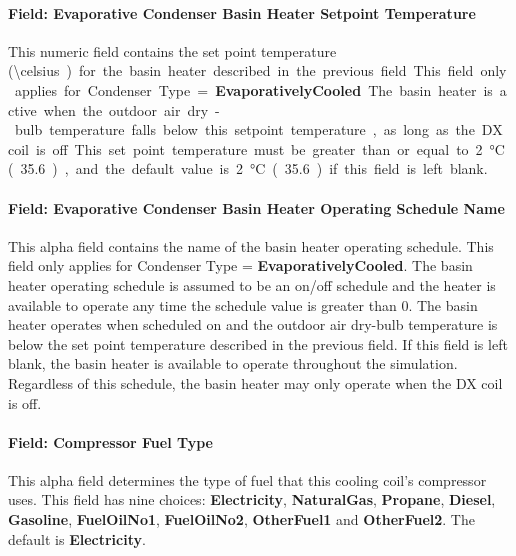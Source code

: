 \paragraph{Field: Evaporative Condenser Basin Heater Setpoint Temperature}\label{field-evaporative-condenser-basin-heater-setpoint-temperature-000}

This numeric field contains the set point temperature (\SI{\celsius}) for the basin heater described in the previous field. This field only applies for Condenser Type = \textbf{EvaporativelyCooled}. The basin heater is active when the outdoor air dry-bulb temperature falls below this setpoint temperature, as long as the DX coil is off. This set point temperature must be greater than or equal to \SI{2}{\celsius} (\SI{35.6}{\fahrenheit}), and the default value is \SI{2}{\celsius} (\SI{35.6}{\fahrenheit}) if this field is left blank.

\paragraph{Field: Evaporative Condenser Basin Heater Operating Schedule Name}\label{field-evaporative-condenser-basin-heater-operating-schedule-name-000}

This alpha field contains the name of the basin heater operating schedule. This field only applies for Condenser Type = \textbf{EvaporativelyCooled}. The basin heater operating schedule is assumed to be an on/off schedule and the heater is available to operate any time the schedule value is greater than 0. The basin heater operates when scheduled on and the outdoor air dry-bulb temperature is below the set point temperature described in the previous field. If this field is left blank, the basin heater is available to operate throughout the simulation. Regardless of this schedule, the basin heater may only operate when the DX coil is off.

\paragraph{Field: Compressor Fuel Type}\label{field-compressor-fuel-type-000}

This alpha field determines the type of fuel that this cooling coil's compressor uses. This field has nine choices: \textbf{Electricity}, \textbf{NaturalGas}, \textbf{Propane}, \textbf{Diesel}, \textbf{Gasoline}, \textbf{FuelOilNo1}, \textbf{FuelOilNo2}, \textbf{OtherFuel1} and \textbf{OtherFuel2}. The default is \textbf{Electricity}.

